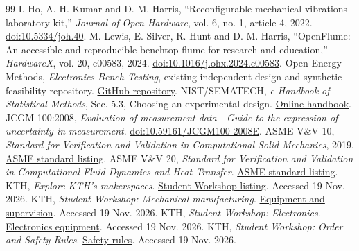 \documentclass[11pt,a4paper]{article}
\begin{document}
\begingroup\small\setlength{\parskip}{1pt}
\begin{thebibliography}{99}\setlength{\itemsep}{2pt}\setlength{\parsep}{0pt}
 I. Ho, A. H. Kumar and D. M. Harris, ``Reconfigurable mechanical vibrations laboratory kit,'' \emph{Journal of Open Hardware}, vol. 6, no. 1, article 4, 2022. \href{https://doi.org/10.5334/joh.40}{doi:10.5334/joh.40}.
 M. Lewis, E. Silver, R. Hunt and D. M. Harris, ``OpenFlume: An accessible and reproducible benchtop flume for research and education,'' \emph{HardwareX}, vol. 20, e00583, 2024. \href{https://doi.org/10.1016/j.ohx.2024.e00583}{doi:10.1016/j.ohx.2024.e00583}.
 Open Energy Methods, \emph{Electronics Bench Testing}, existing independent design and synthetic feasibility repository. \href{https://github.com/Open-Energy-Methods/electronics-bench-testing}{GitHub repository}.
 NIST/SEMATECH, \emph{e-Handbook of Statistical Methods}, Sec. 5.3, Choosing an experimental design. \href{https://www.itl.nist.gov/div898/handbook/pri/section3/pri3.htm}{Online handbook}.
 JCGM 100:2008, \emph{Evaluation of measurement data---Guide to the expression of uncertainty in measurement}. \href{https://doi.org/10.59161/JCGM100-2008E}{doi:10.59161/JCGM100-2008E}.
 ASME V\&V 10, \emph{Standard for Verification and Validation in Computational Solid Mechanics}, 2019. \href{https://www.asme.org/codes-standards/find-codes-standards/standard-for-verification-and-validation-in-computational-solid-mechanics/2019}{ASME standard listing}.
 ASME V\&V 20, \emph{Standard for Verification and Validation in Computational Fluid Dynamics and Heat Transfer}. \href{https://www.asme.org/codes-standards/find-codes-standards/standard-for-verification-and-validation-in-computational-fluid-dynamics-and-heat-transfer}{ASME standard listing}.
 KTH, \emph{Explore KTH's makerspaces}. \href{https://www.kth.se/en/student/kontakt/campus/makerspaces/explore/explore-1.1455863}{Student Workshop listing}. Accessed 19 Nov. 2026.
 KTH, \emph{Student Workshop: Mechanical manufacturing}. \href{https://www.kth.se/emp/student-workshop/verkstan/mekanik-1.686913}{Equipment and supervision}. Accessed 19 Nov. 2026.
 KTH, \emph{Student Workshop: Electronics}. \href{https://www.kth.se/emp/student-workshop/verkstan/elektronik-1.686912}{Electronics equipment}. Accessed 19 Nov. 2026.
 KTH, \emph{Student Workshop: Order and Safety Rules}. \href{https://www.kth.se/emp/student-workshop/regler-och-sakerhet}{Safety rules}. Accessed 19 Nov. 2026.
\end{thebibliography}\endgroup
\end{document}
